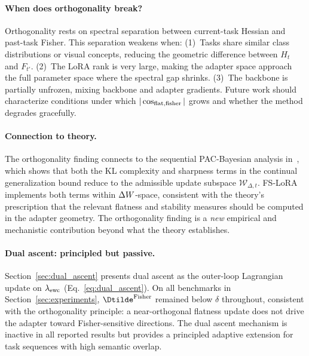 \paragraph{When does orthogonality break?}
Orthogonality rests on spectral separation between current-task Hessian and past-task Fisher.
This separation weakens when:
(1)~Tasks share similar class distributions or visual concepts, reducing the geometric difference
between $H_t$ and $F_{t'}$.
(2)~The LoRA rank is very large, making the adapter space approach the full parameter space
where the spectral gap shrinks.
(3)~The backbone is partially unfrozen, mixing backbone and adapter gradients.
Future work should characterize conditions under which $|\cos_{\mathrm{flat,fisher}}|$ grows and whether
the method degrades gracefully.

\paragraph{Connection to theory.}
The orthogonality finding connects to the sequential PAC-Bayesian analysis
in~\citet{Anonymous2026PaperB}, which shows that both the KL complexity and
sharpness terms in the continual generalization bound reduce to the admissible update
subspace $\mathcal{W}_{\Delta,t}$.
FS-LoRA implements both terms within $\Delta W$-space, consistent with the theory's
prescription that the relevant flatness and stability measures should be computed
in the adapter geometry.
The orthogonality finding is a \emph{new} empirical and mechanistic contribution
beyond what the theory establishes.

\paragraph{Dual ascent: principled but passive.}
Section~\ref{sec:dual_ascent} presents dual ascent as the outer-loop Lagrangian update
on $\lambda_{\mathrm{ewc}}$ (Eq.~\eqref{eq:dual_ascent}).
On all benchmarks in Section~\ref{sec:experiments},
$\Dtilde^{\mathrm{Fisher}}$ remained below $\delta$ throughout,
consistent with the orthogonality principle: a near-orthogonal flatness update
does not drive the adapter toward Fisher-sensitive directions.
The dual ascent mechanism is inactive in all reported results but provides
a principled adaptive extension for task sequences with high semantic overlap.
